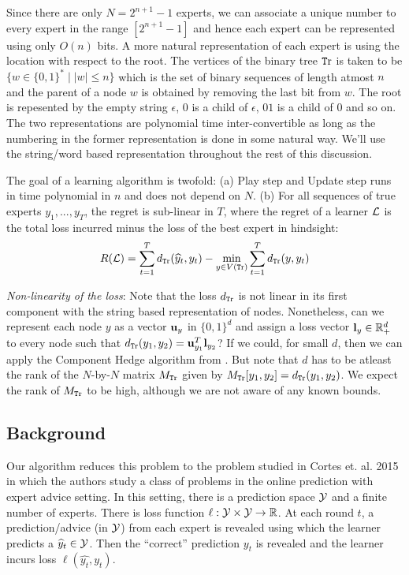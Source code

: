 Since there are only $N = 2^{n+1} - 1$ experts, we can associate a unique number to every expert in the range $[2^{n+1}-1]$ and hence each expert can be represented using only $O(n)$ bits. A more natural representation of each expert is using the location with respect to the root. The vertices of the binary tree $\text{\texttt Tr}$ is taken to be $\{w \in \{0,1\}^* \mid |w| \leq n\}$ which is the set of binary sequences of length atmost $n$ and the parent of a node $w$ is obtained by removing the last bit from $w$. The root is repesented by the empty string $\epsilon$, $0$ is a child of $\epsilon$, $01$ is a child of $0$ and so on. The two representations are polynomial time inter-convertible as long as the numbering in the former representation is done in some natural way. We'll use the string/word based representation throughout the rest of this discussion.

The goal of a learning algorithm is twofold: (a) Play step and Update step runs in time polynomial in $n$ and does not depend on $N$. (b) For all sequences of true experts $y_1,...,y_T$, the regret is sub-linear in $T$, where the regret of a learner ${\mathcal L}$ is the total loss incurred minus the loss of the best expert in hindsight:
$$R({\mathcal L}) = \sum_{t=1}^T d_{\text{\texttt Tr}}(\widehat{y}_t,y_t) - \min_{y \in V(\text{\texttt Tr})}\sum_{t=1}^T d_{\text{\texttt Tr}}(y,y_t)$$

\textit{Non-linearity of the loss}: Note that the loss $d_{\text{\texttt Tr}}$ is not linear in its first component with the string based representation of nodes. Nonetheless, can we represent each node $y$ as a vector ${\mathbf u}_y$ in $\{0,1\}^d$ and assign a loss vector ${\mathbf l}_y \in {\mathbb R}_+^d$ to every node such that $d_{\text{\texttt Tr}}(y_1,y_2) = {\mathbf u}_{y_1}^T{\mathbf l}_{y_2}$? If we could, for small $d$, then we can apply the Component Hedge algorithm from \cite{koolen2010hedging}. But note that $d$ has to be atleast the rank of the $N$-by-$N$ matrix $M_{\text{\texttt Tr}}$ given by $M_{\text{\texttt Tr}}[y_1,y_2] = d_{\text{\texttt Tr}}(y_1,y_2)$. We expect the rank of $M_{\text{\texttt Tr}}$ to be high, although we are not aware of any known bounds.

\subsection{Background}
Our algorithm reduces this problem to the problem studied in Cortes et. al. 2015 \cite{cortes2015line} in which the authors study a class of problems in the online prediction with expert advice setting. In this setting, there is a prediction space ${\mathcal Y}$ and a finite number of experts. There is loss function $\ell:{\mathcal Y}\times{\mathcal Y} \to {\mathbb R}$. At each round $t$, a prediction/advice (in ${\mathcal Y}$) from each expert is revealed using which the learner predicts a $\widehat{y}_t \in {\mathcal Y}$. Then the ``correct'' prediction $y_t$ is revealed and the learner incurs loss $\ell(\hat{y_t},y_t)$. 


